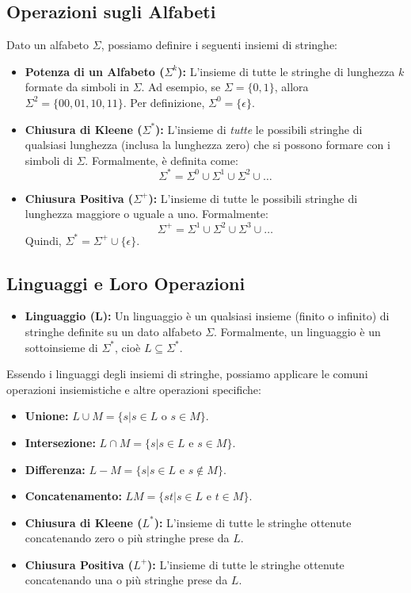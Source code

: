 \subsection{Operazioni sugli Alfabeti}
Dato un alfabeto $\Sigma$, possiamo definire i seguenti insiemi di stringhe:
\begin{itemize}
    \item \textbf{Potenza di un Alfabeto ($\Sigma^k$):} L'insieme di tutte le stringhe di lunghezza $k$ formate da simboli in $\Sigma$. Ad esempio, se $\Sigma = \{0, 1\}$, allora $\Sigma^2 = \{00, 01, 10, 11\}$. Per definizione, $\Sigma^0 = \{\epsilon\}$.
    \item \textbf{Chiusura di Kleene ($\Sigma^*$):} L'insieme di \textit{tutte} le possibili stringhe di qualsiasi lunghezza (inclusa la lunghezza zero) che si possono formare con i simboli di $\Sigma$. Formalmente, è definita come:
    \[ \Sigma^* = \Sigma^0 \cup \Sigma^1 \cup \Sigma^2 \cup \dots \]
    \item \textbf{Chiusura Positiva ($\Sigma^+$):} L'insieme di tutte le possibili stringhe di lunghezza maggiore o uguale a uno. Formalmente:
    \[ \Sigma^+ = \Sigma^1 \cup \Sigma^2 \cup \Sigma^3 \cup \dots \]
    Quindi, $\Sigma^* = \Sigma^+ \cup \{\epsilon\}$.
\end{itemize}

\subsection{Linguaggi e Loro Operazioni}
\begin{itemize}
    \item \textbf{Linguaggio (L):} Un linguaggio è un qualsiasi insieme (finito o infinito) di stringhe definite su un dato alfabeto $\Sigma$. Formalmente, un linguaggio è un sottoinsieme di $\Sigma^*$, cioè $L \subseteq \Sigma^*$.
\end{itemize}

Essendo i linguaggi degli insiemi di stringhe, possiamo applicare le comuni operazioni insiemistiche e altre operazioni specifiche:
\begin{itemize}
    \item \textbf{Unione:} $L \cup M = \{s | s \in L \text{ o } s \in M\}$.
    \item \textbf{Intersezione:} $L \cap M = \{s | s \in L \text{ e } s \in M\}$.
    \item \textbf{Differenza:} $L - M = \{s | s \in L \text{ e } s \notin M\}$.
    \item \textbf{Concatenamento:} $LM = \{st | s \in L \text{ e } t \in M\}$.
    \item \textbf{Chiusura di Kleene ($L^*$):} L'insieme di tutte le stringhe ottenute concatenando zero o più stringhe prese da $L$.
    \item \textbf{Chiusura Positiva ($L^+$):} L'insieme di tutte le stringhe ottenute concatenando una o più stringhe prese da $L$.
\end{itemize}

